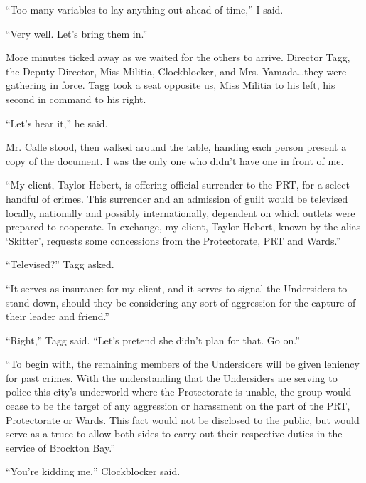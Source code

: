 ``Too many variables to lay anything out ahead of time,'' I said.



``Very well.  Let's bring them in.''



More minutes ticked away as we waited for the others to arrive.  Director Tagg, the Deputy Director, Miss Militia, Clockblocker, and Mrs. Yamada\ldots they were gathering in force.  Tagg took a seat opposite us, Miss Militia to his left, his second in command to his right.



``Let's hear it,'' he said.



Mr. Calle stood, then walked around the table, handing each person present a copy of the document.  I was the only one who didn't have one in front of me.



``My client, Taylor Hebert, is offering official surrender to the PRT, for a select handful of crimes.  This surrender and an admission of guilt would be televised locally, nationally and possibly internationally, dependent on which outlets were prepared to cooperate.  In exchange, my client, Taylor Hebert, known by the alias `Skitter', requests some concessions from the Protectorate, PRT and Wards.''



``Televised?'' Tagg asked.



``It serves as insurance for my client, and it serves to signal the Undersiders to stand down, should they be considering any sort of aggression for the capture of their leader and friend.''



``Right,'' Tagg said.  ``Let's pretend she didn't plan for that.  Go on.''



``To begin with, the remaining members of the Undersiders will be given leniency for past crimes.  With the understanding that the Undersiders are serving to police this city's underworld where the Protectorate is unable, the group would cease to be the target of any aggression or harassment on the part of the PRT, Protectorate or Wards.  This fact would not be disclosed to the public, but would serve as a truce to allow both sides to carry out their respective duties in the service of Brockton Bay.''



``You're kidding me,'' Clockblocker said.



